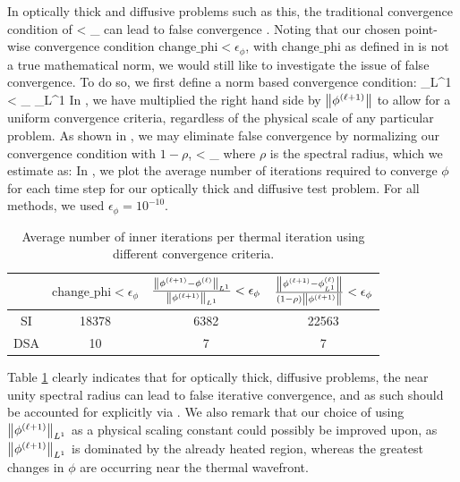 In optically thick and diffusive problems such as this, the traditional convergence condition of 
\benum
{} < \epsilon_{\phi} \pec
\eenum
can lead to false convergence \cite{adams_larsen_fast_iterative}.
Noting that our chosen point-wise convergence condition $\text{change\_phi} < \epsilon_{\phi}$, with $\text{change\_phi}$ as defined in   is not a true mathematical norm, we would still like to investigate the issue of false convergence.
To do so, we first define a norm based convergence condition:
\benum
{}_{L^1} < \epsilon_{\phi} _{L^1} \pep
\label{eq:l1}
\eenum
In , we have multiplied the right hand side by $\left\lVert  \phi^{(\ell+1)}  \right\rVert$ to allow for a uniform convergence criteria, regardless of the physical scale of any particular problem.
As shown in \cite{adams_larsen_fast_iterative}, we may eliminate false convergence by normalizing our convergence condition with $1-\rho$,
\benum
{}< \epsilon_{\phi} \pec
\label{eq:rho_convergence}
\eenum
where $\rho$ is the spectral radius, which we estimate as:
\benum
\rho \approx {}\pep
\eenum
In , we plot the average number of iterations required to converge $\phi$ for each time step for our optically thick and diffusive test problem.  For all methods, we used $\epsilon_{\phi} = 10^{-10}$.
\begin{table}[!hbp]
\centering
\caption{Average number of inner iterations per thermal iteration using different convergence criteria.}
\label{tbl:rho_iters}
\begin{tabular}{|c|c|c|c|}
\hline
{}  &  $\text{change\_phi} <\epsilon_{\phi}$ & 
		$ \frac{\left\lVert  \phi^{(\ell+1)} - \phi^{(\ell)}  \right\rVert_{L^1} }{ \left\lVert  \phi^{(\ell+1)} \right\rVert_{L^1}  } < \epsilon_{\phi}$  & 
		$\frac{\left\lVert \phi^{(\ell+1)} - \phi^{(\ell)}_{L^1}  \right\rVert }{ (1- \rho) \left\lVert \phi^{(\ell+1)} \right\rVert }< \epsilon_{\phi} $\\
		\hline
SI & 18378 & 6382 & 22563 \\
\hline
DSA & 10 & 7 & 7 \\
\hline
\end{tabular}
\end{table}
Table \ref{tbl:rho_iters} clearly indicates that for optically thick, diffusive problems, the near unity spectral radius can lead to false iterative convergence, and as such should be accounted for explicitly via .  
We also remark that our choice of using $\left\lVert \phi^{(\ell+1)}  \right\rVert_{L^1}$ as a physical scaling constant could possibly be improved upon, as $\left\lVert \phi^{(\ell+1)} \right\rVert_{L^1}$ is dominated by the already heated region, whereas the greatest changes in $\phi$ are occurring near the thermal wavefront.



